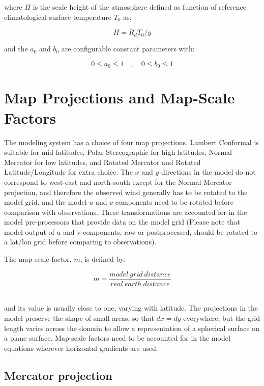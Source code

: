 where $H$ is the scale height of the atmosphere defined as function of
reference climatological surface temperature $T_0$ as:

\begin{equation}
H = R_d T_0 / g
\end{equation}

and the $a_0$ and $b_0$ are configurable constant parameters with:

\begin{equation}
0 \le a_0 \le 1 \quad , \quad 0 \le b_0 \le 1
\end{equation}

\section{Map Projections and Map-Scale Factors}
The modeling system has a
choice of four map projections. Lambert Conformal is suitable for mid-latitudes,
Polar Stereographic for high latitudes, Normal Mercator for low latitudes, and
Rotated Mercator and Rotated Latitude/Longitude for extra choice.
The $x$ and $y$ directions in the model do
not correspond to west-east and north-south except for the Normal Mercator
projection, and therefore the observed wind generally has to be rotated to the
model grid, and the model $u$ and $v$ components need to be rotated before
comparison with observations. These transformations are accounted for in the
model pre-processors that provide data on the model grid (Please note that
model output of u and v components, raw or postprocessed, should be rotated to a
lat/lon grid before comparing to observations).

The map scale factor, $m$, is defined by:

\begin{equation}
  m = \frac{model\:grid\:distance}{real\:earth\:distance}
\end{equation}

\noindent \\ and its value is usually close to one, varying with latitude. The
projections in the model preserve the shape of small areas, so that $dx=dy$
everywhere, but the grid length varies across the domain to allow a
representation of a spherical surface on a plane surface.
Map-scale factors need to be accounted for in the model equations wherever
horizontal gradients are used.

\subsection{Mercator projection}


